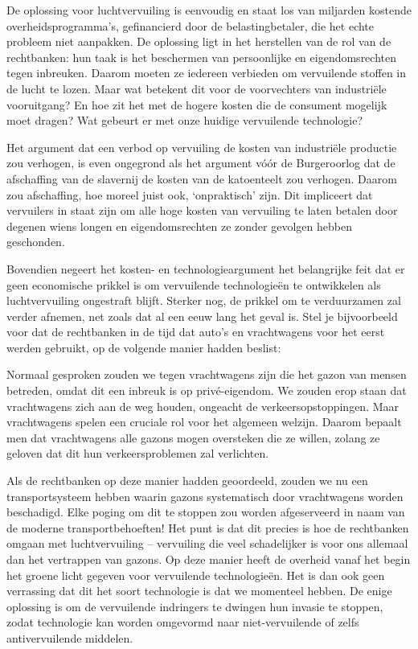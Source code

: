 \documentclass[
  a5paper,
  smalldemyvopaper,10pt,twoside,onecolumn,openright,extrafontsizes,hidelinks]{memoir}
\renewenvironment{quote}%
               {\list{}{\rightmargin=.6cm\leftmargin=.6cm}%
                \itshape \item[]}%
               {\endlist}
\begin{document}
De oplossing voor luchtvervuiling is eenvoudig en staat los van
miljarden kostende overheidsprogramma's, gefinancierd door de
belastingbetaler, die het echte probleem niet aanpakken. De oplossing
ligt in het herstellen van de rol van de rechtbanken: hun taak is het
beschermen van persoonlijke en eigendomsrechten tegen inbreuken. Daarom
moeten ze iedereen verbieden om vervuilende stoffen in de lucht te
lozen. Maar wat betekent dit voor de voorvechters van industriële
vooruitgang? En hoe zit het met de hogere kosten die de consument
mogelijk moet dragen? Wat gebeurt er met onze huidige vervuilende
technologie?

Het argument dat een verbod op vervuiling de kosten van industriële
productie zou verhogen, is even ongegrond als het argument vóór de
Burgeroorlog dat de afschaffing van de slavernij de kosten van de
katoenteelt zou verhogen. Daarom zou afschaffing, hoe moreel juist ook,
`onpraktisch' zijn. Dit impliceert dat vervuilers in staat zijn om alle
hoge kosten van vervuiling te laten betalen door degenen wiens longen en
eigendomsrechten ze zonder gevolgen hebben geschonden.

Bovendien negeert het kosten- en technologieargument het belangrijke
feit dat er geen economische prikkel is om vervuilende technologieën te
ontwikkelen als luchtvervuiling ongestraft blijft. Sterker nog, de
prikkel om te verduurzamen zal verder afnemen, net zoals dat al een eeuw
lang het geval is. Stel je bijvoorbeeld voor dat de rechtbanken in de
tijd dat auto's en vrachtwagens voor het eerst werden gebruikt, op de
volgende manier hadden beslist:

\begin{quote}
Normaal gesproken zouden we tegen vrachtwagens zijn die het gazon van
mensen betreden, omdat dit een inbreuk is op privé-eigendom. We zouden
erop staan dat vrachtwagens zich aan de weg houden, ongeacht de
verkeersopstoppingen. Maar vrachtwagens spelen een cruciale rol voor het
algemeen welzijn. Daarom bepaalt men dat vrachtwagens alle gazons mogen
oversteken die ze willen, zolang ze geloven dat dit hun
verkeersproblemen zal verlichten.
\end{quote}

Als de rechtbanken op deze manier hadden geoordeeld, zouden we nu een
transportsysteem hebben waarin gazons systematisch door vrachtwagens
worden beschadigd. Elke poging om dit te stoppen zou worden afgeserveerd
in naam van de moderne transportbehoeften! Het punt is dat dit precies
is hoe de rechtbanken omgaan met luchtvervuiling -- vervuiling die veel
schadelijker is voor ons allemaal dan het vertrappen van gazons. Op deze
manier heeft de overheid vanaf het begin het groene licht gegeven voor
vervuilende technologieën. Het is dan ook geen verrassing dat dit het
soort technologie is dat we momenteel hebben. De enige oplossing is om
de vervuilende indringers te dwingen hun invasie te stoppen, zodat
technologie kan worden omgevormd naar niet-vervuilende of zelfs
antivervuilende middelen.
\end{document}
